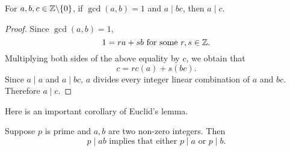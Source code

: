\begin{theorem}
    For $a,b,c\in\mathbb{Z}\backslash\{0\}$, if $\gcd(a,b)=1$ and $a\mid bc$,
    then $a\mid c$.
\end{theorem}

\begin{proof}
    Since $\gcd(a,b)=1$,
    \[1=ra+sb\text{ for some }r,s\in\mathbb{Z}.\]
    Multiplying both sides of the above equality by $c$,
    we obtain that
    \[c=rc(a)+s(bc).\]
    Since $a\mid a$ and $a\mid bc$, $a$ divides every integer linear
    combination of $a$ and $bc$. Therefore $a\mid c$.
\end{proof}

Here is an important corollary of Euclid's lemma.

\begin{corollary}
    Suppose $p$ is prime and $a,b$ are two non-zero integers. Then 
    \[p\mid ab\text{ implies that either }p\mid a\text{ or }p\mid b.\]
\end{corollary}